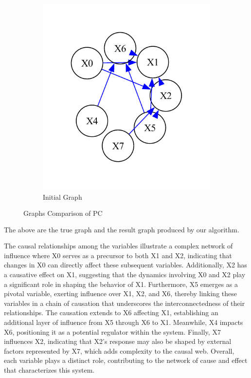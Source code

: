 \documentclass{article}
\begin{document}
\begin{figure}[H]
\begin{subfigure}{0.45\textwidth}
        \includegraphics[width=\linewidth]{postprocess/test_data/20241007_184921_base_nodes8_samples1500/output_graph/initial_graph.pdf}
        \vfill
        \caption{Initial Graph}
        \label{fig:sub2}
    \end{subfigure}
    \caption{Graphs Comparison of PC}
    \label{fig:main}
\end{figure}

The above are the true graph and the result graph produced by our algorithm.

The causal relationships among the variables illustrate a complex network of influence where X0 serves as a precursor to both X1 and X2, indicating that changes in X0 can directly affect these subsequent variables. Additionally, X2 has a causative effect on X1, suggesting that the dynamics involving X0 and X2 play a significant role in shaping the behavior of X1. Furthermore, X5 emerges as a pivotal variable, exerting influence over X1, X2, and X6, thereby linking these variables in a chain of causation that underscores the interconnectedness of their relationships. The causation extends to X6 affecting X1, establishing an additional layer of influence from X5 through X6 to X1. Meanwhile, X4 impacts X6, positioning it as a potential regulator within the system. Finally, X7 influences X2, indicating that X2's response may also be shaped by external factors represented by X7, which adds complexity to the causal web. Overall, each variable plays a distinct role, contributing to the network of cause and effect that characterizes this system.
\end{document}
